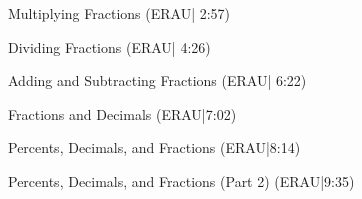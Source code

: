 \documentclass{ximera}
\begin{document}

Multiplying Fractions (ERAU| 2:57)


Dividing Fractions (ERAU| 4:26)


Adding and Subtracting Fractions (ERAU| 6:22)


Fractions and Decimals (ERAU|7:02)


Percents, Decimals, and Fractions (ERAU|8:14)


Percents, Decimals, and Fractions (Part 2) (ERAU|9:35)

\end{document}
